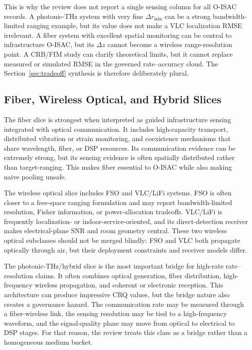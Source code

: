 \documentclass[letterpaper,journal]{IEEEtran}
\begin{document}
This is why the review does not report a single sensing column for all O-ISAC records. A photonic-THz system with very fine \(\Delta r_{\min}\) can be a strong bandwidth-limited ranging example, but its value does not make a VLC localization RMSE irrelevant. A fiber system with excellent spatial monitoring can be central to infrastructure O-ISAC, but its \(\Delta z\) cannot become a wireless range-resolution point. A CRB/FIM study can clarify theoretical limits, but it cannot replace measured or simulated RMSE in the governed rate--accuracy cloud. The Section~\ref{sec:tradeoff} synthesis is therefore deliberately plural.

\subsection{Fiber, Wireless Optical, and Hybrid Slices}

The fiber slice is strongest when interpreted as guided infrastructure sensing integrated with optical communication. It includes high-capacity transport, distributed vibration or strain monitoring, and coexistence mechanisms that share wavelength, fiber, or DSP resources. Its communication evidence can be extremely strong, but its sensing evidence is often spatially distributed rather than target-ranging. This makes fiber essential to O-ISAC while also making naive pooling unsafe.

The wireless optical slice includes FSO and VLC/LiFi systems. FSO is often closer to a free-space ranging formulation and may report bandwidth-limited resolution, Fisher information, or power-allocation tradeoffs. VLC/LiFi is frequently localization- or indoor-service-oriented, and its direct-detection receiver makes electrical-plane SNR and room geometry central. These two wireless optical subclasses should not be merged blindly: FSO and VLC both propagate optically through air, but their deployment constraints and receiver models differ.

The photonic-THz/hybrid slice is the most important bridge for high-rate rate--resolution claims. It often combines optical generation, fiber distribution, high-frequency wireless propagation, and coherent or electronic reception. This architecture can produce impressive CRQ values, but the bridge nature also creates a governance hazard. The communication rate may be measured through a fiber-wireless link, the sensing resolution may be tied to a high-frequency waveform, and the signal-quality plane may move from optical to electrical to DSP stages. For that reason, the review treats this class as a bridge rather than a homogeneous medium bucket.
\end{document}
